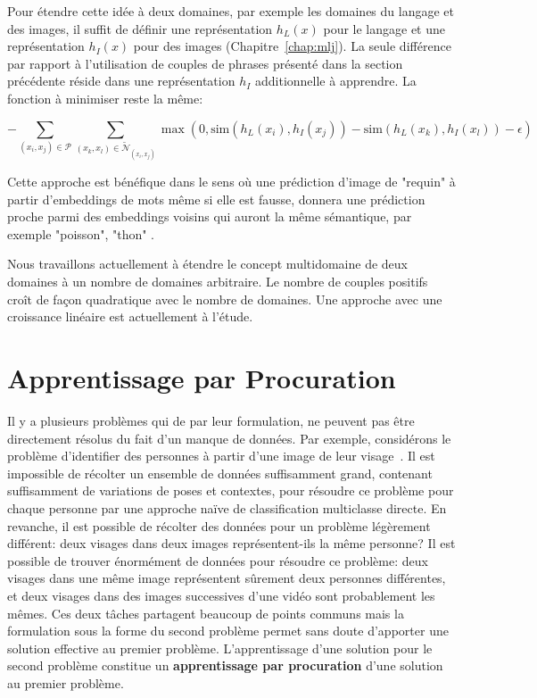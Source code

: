Pour étendre cette idée à deux domaines, par exemple les domaines du langage et
des images, il suffit de définir une représentation $h_L(x)$ pour le langage et
une représentation $h_I(x)$ pour des images (Chapitre~\ref{chap:mlj}). La seule
différence par rapport à l'utilisation de couples de phrases présenté dans la
section précédente réside dans une représentation $h_I$ additionnelle à
apprendre. La fonction à minimiser reste la même:

 \begin{equation}
-\sum_{(x_i, x_j)\in\mathcal{P}}\sum_{(x_k, x_l)\in\tilde{\mathcal{N}}_{(x_i, x_j)}} \max (0, \textrm{sim}(h_L(x_i), h_I(x_j)) - \textrm{sim}(h_L(x_k), h_I(x_l)) - \epsilon)
\end{equation}

Cette approche est bénéfique dans le sens où une prédiction d'image de "requin"
à partir d'embeddings de mots même si elle est fausse, donnera une prédiction
proche parmi des embeddings voisins qui auront la même sémantique, par exemple
"poisson", "thon" \citep{samy-extreme}.

Nous travaillons actuellement à étendre le concept multidomaine de deux
domaines à un nombre de domaines arbitraire. Le nombre de couples positifs
croît de façon quadratique avec le nombre de domaines. Une approche avec
une croissance linéaire est actuellement à l'étude.

\section{Apprentissage par Procuration}

Il y a plusieurs problèmes qui de par leur formulation, ne peuvent pas être
directement résolus du fait d'un manque de données. Par exemple, considérons le
problème d'identifier des personnes à partir d'une image de leur
visage~\citep{bottou-11}.  Il est impossible de récolter un ensemble de données
suffisamment grand, contenant suffisamment de variations de poses et contextes,
pour résoudre ce problème pour chaque personne par une approche naïve de
classification multiclasse directe. En revanche, il est possible de récolter
des données pour un problème légèrement différent: deux visages dans deux
images représentent-ils la même personne? Il est possible de trouver énormément
de données pour résoudre ce problème: deux visages dans une même image
représentent sûrement deux personnes différentes, et deux visages dans des
images successives d'une vidéo sont probablement les mêmes. Ces deux tâches
partagent beaucoup de points communs mais la formulation sous la forme du
second problème permet sans doute d'apporter une solution effective au premier
problème. L'apprentissage d'une solution pour le second problème constitue un
{\bf apprentissage par procuration} d'une solution au premier problème.\\

